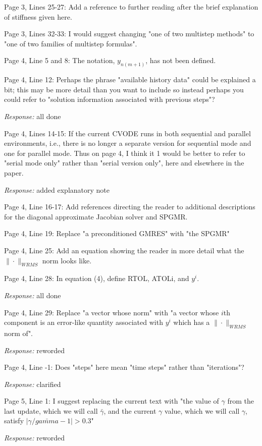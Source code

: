 Page 3, Lines 25-27: Add a reference to further reading after the
brief explanation of stiffness given here.

Page 3, Lines 32-33: I would suggest changing "one of two multistep
methods" to "one of two families of multistep formulas".

Page 4, Line 5 and 8: The notation, $y_{n(m+1)}$, has not been defined.  

Page 4, Line 12: Perhaps the phrase "available history data" could be
explained a bit; this may be more detail than you want to include so
instead perhaps you could refer to "solution information associated
with previous steps"?

{\em Response:} all done

Page 4, Lines 14-15: If the current CVODE runs in both sequential and
parallel environments, i.e., there is no longer a separate version for
sequential mode and one for parallel mode. Thus on page 4, I think it
1 would be better to refer to "serial mode only" rather than "serial
version only", here and elsewhere in the paper.

{\em Response:} added explanatory note

Page 4, Line 16-17: Add references directing the reader to additional
descriptions for the diagonal approximate Jacobian solver and SPGMR.

Page 4, Line 19: Replace "a preconditioned GMRES" with "the SPGMR"

Page 4, Line 25: Add an equation showing the reader in more detail
what the $\|\cdot\|_{WRMS}$ norm looks like.

Page 4, Line 28: In equation (4), define RTOL, ATOLi, and $y^i$.

{\em Response:} all done

Page 4, Line 29: Replace "a vector whose norm" with "a vector whose $i$th
component is an error-like quantity associated with $y^i$ which has a 
$\|\cdot\|_{WRMS}$ norm of".

{\em Response:} reworded

Page 4, Line -1: Does "steps" here mean "time steps" rather than "iterations"?

{\em Response:} clarified

Page 5, Line 1: I suggest replacing the current text with "the value
of $\gamma$ from the last update, which we will call $\bar{\gamma}$,
and the current $\gamma$ value, which we will call $\gamma$, satisfy 
$|\gamma/\bar{gamma} - 1| > 0.3 $"

{\em Response:} reworded

